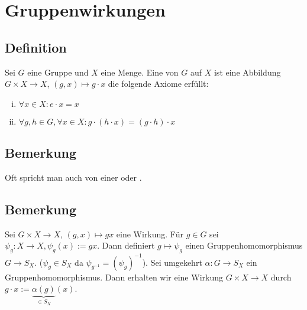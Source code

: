 \section{Gruppenwirkungen} %
\label{sec:3}

\subsection[Definition: Wirkung]{Definition} %
\label{sub:31}
Sei $G$ eine Gruppe und $X$ eine Menge. Eine  von $G$ auf $X$ ist eine Abbildung $G \times X \to X$, $(g,x) \mapsto g \cdot x$ die folgende Axiome erfüllt:
\begin{enumerate}[(i)]
	\item $\forall x \in X : e \cdot x = x$
	\item $\forall g,h \in G, \forall x \in X : g \cdot (h \cdot x) = (g \cdot h) \cdot x$
\end{enumerate}

\subsection[Bemerkung: Anderer Namen für Wirkungen]{Bemerkung} %
\label{sub:32}
Oft spricht man auch von einer  oder .

\subsection[Bemerkung zu Wirkungen und Gruppenhomomorphismen]{Bemerkung} %
\label{sub:33}
Sei $G \times X \to X$, $(g,x) \mapsto g x$ eine Wirkung. Für $g \in G$ sei $\psi_g : X \to X, \psi_g(x) := g x$. Dann definiert $g \mapsto \psi_g$ einen 
Gruppenhomomorphismus  $G \to S_X$. ($\psi_g \in S_X$ da $\psi_{g ^{-1}} = (\psi_g) ^{-1}$). Sei umgekehrt $\alpha : G \to S_X$ ein Gruppenhomomorphismus. Dann erhalten wir 
eine Wirkung $G \times X \to X$ durch $g \cdot x := \underbrace{\alpha(g)}_{\in S_X} (x)$.

